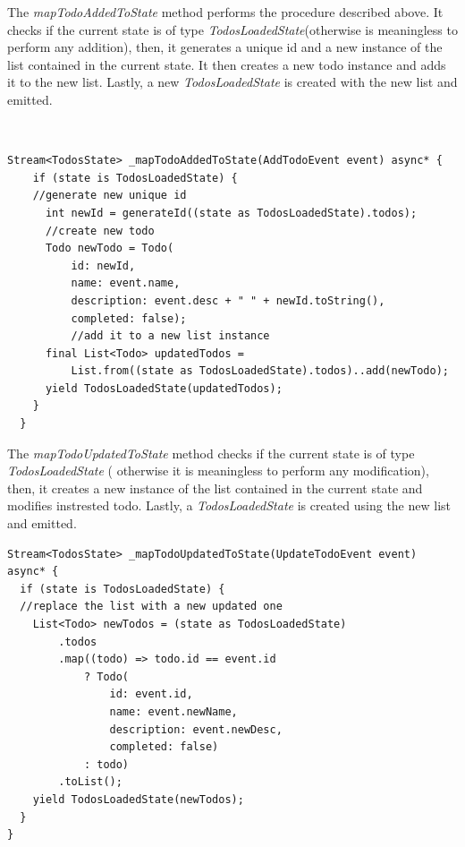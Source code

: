 The \textit{mapTodoAddedToState}  method performs the procedure described above. It checks if the current state is of type \textit{TodosLoadedState}(otherwise is meaningless to perform any addition), then,  it generates a unique id and a new instance of the list contained in the current state. It then creates a new todo instance and adds it to the new list. Lastly, a new \textit{TodosLoadedState} is created with the new list and emitted. 
\begin{code}
\mbox{}\\
 \mbox{}
\label{code:2.14}
\begin{verbatim}
Stream<TodosState> _mapTodoAddedToState(AddTodoEvent event) async* {
    if (state is TodosLoadedState) {
    //generate new unique id
      int newId = generateId((state as TodosLoadedState).todos);
      //create new todo
      Todo newTodo = Todo(
          id: newId,
          name: event.name,
          description: event.desc + " " + newId.toString(),
          completed: false);
          //add it to a new list instance
      final List<Todo> updatedTodos =
          List.from((state as TodosLoadedState).todos)..add(newTodo);
      yield TodosLoadedState(updatedTodos);
    }
  }
\end{verbatim}
\mbox{}
\end{code}


The \textit{mapTodoUpdatedToState} method checks if the current state is of type \textit{TodosLoadedState} ( otherwise it is meaningless to perform any modification), then, it creates a new instance of the list contained in the current state and modifies instrested todo. Lastly, a \textit{TodosLoadedState} is created using the new list and emitted. 

\begin{code}
\mbox{}
 \mbox{}
\label{code:2.14}
\begin{verbatim}
Stream<TodosState> _mapTodoUpdatedToState(UpdateTodoEvent event) async* {
  if (state is TodosLoadedState) {
  //replace the list with a new updated one
    List<Todo> newTodos = (state as TodosLoadedState)
        .todos
        .map((todo) => todo.id == event.id
            ? Todo(
                id: event.id,
                name: event.newName,
                description: event.newDesc,
                completed: false)
            : todo)
        .toList();
    yield TodosLoadedState(newTodos);
  }
}
\end{verbatim}
\mbox{}
\end{code}
